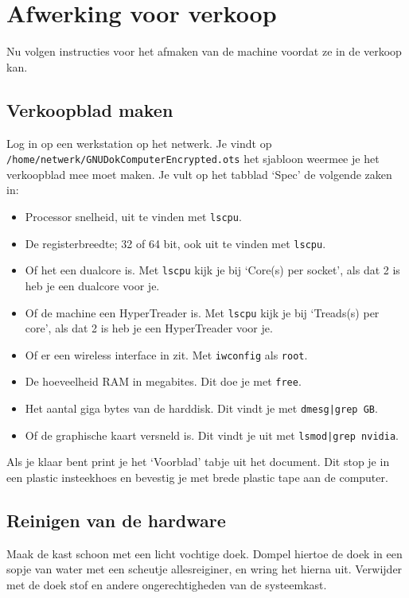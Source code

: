 \documentclass[12pt,a4paper]{article}
\begin{document}
\section{Afwerking voor verkoop}
Nu volgen instructies voor het afmaken van de machine voordat ze in de verkoop kan.
\subsection{Verkoopblad maken}
Log in op een werkstation op het netwerk. Je vindt op \texttt{/home/netwerk/GNUDokComputerEncrypted.ots} het sjabloon weermee je het verkoopblad mee moet maken. Je vult op het tabblad `Spec' de volgende zaken in:
\begin{itemize}
	\item Processor snelheid, uit te vinden met \texttt{lscpu}.
	\item De registerbreedte; 32 of 64 bit, ook uit te vinden met \texttt{lscpu}.
	\item Of het een dualcore is. Met \texttt{lscpu} kijk je bij `Core(s) per socket', als dat 2 is heb je een dualcore voor je.
	\item Of de machine een HyperTreader is. Met \texttt{lscpu} kijk je bij `Treads(s) per core', als dat 2 is heb je een HyperTreader voor je. 
	\item Of er een wireless interface in zit. Met \texttt{iwconfig} als \texttt{root}.
	\item De hoeveelheid RAM in megabites. Dit doe je met \texttt{free}.
	\item Het aantal giga bytes van de harddisk. Dit vindt je met \texttt{dmesg|grep GB}.
	\item Of de graphische kaart versneld is. Dit vindt je uit met \texttt{lsmod|grep nvidia}.
\end{itemize}

Als je klaar bent print je het `Voorblad' tabje uit het document. Dit stop je in een plastic insteekhoes en bevestig je met brede plastic tape aan de computer.
\subsection{Reinigen van de hardware}
Maak de kast schoon met een licht vochtige doek. Dompel hiertoe de doek in een sopje van water met een scheutje allesreiginer, en wring het hierna uit. Verwijder met de doek stof en andere ongerechtigheden van de systeemkast.
\end{document}
